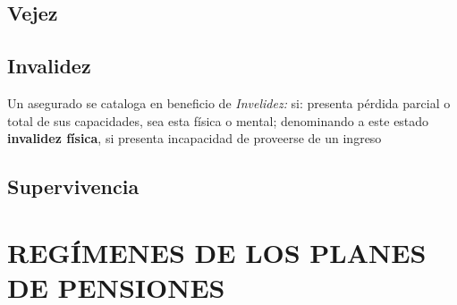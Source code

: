 \subsection{Vejez}




\subsection{Invalidez}

Un asegurado se cataloga en beneficio de \textit{Invelidez:} si: presenta pérdida parcial o total de sus capacidades, sea esta física o mental; denominando a este estado \textbf{invalidez física}, si presenta incapacidad de proveerse de un ingreso 

\subsection{Supervivencia}


\section{REGÍMENES DE LOS PLANES DE PENSIONES}



